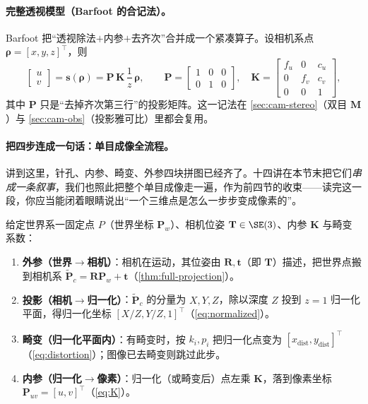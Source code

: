 \paragraph{完整透视模型（Barfoot 的合记法）。}
Barfoot\cite{barfoot2024state} 把“透视除法$+$内参$+$去齐次”合并成一个紧凑算子。设相机系点 $\boldsymbol\rho=[x,y,z]^\top$，则
\begin{equation}
  \begin{bmatrix}u\\v\end{bmatrix}=\mathbf{s}(\boldsymbol\rho)=\mathbf{P}\,\mathbf{K}\,\frac1z\,\boldsymbol\rho,\qquad
  \mathbf{P}=\begin{bmatrix}1&0&0\\0&1&0\end{bmatrix},\quad
  \mathbf{K}=\begin{bmatrix}f_u&0&c_u\\0&f_v&c_v\\0&0&1\end{bmatrix},
  \label{eq:complete-perspective}
\end{equation}
其中 $\mathbf{P}$ 只是“去掉齐次第三行”的投影矩阵。这一记法在 \cref{sec:cam-stereo}（双目 $\mathbf{M}$）与 \cref{sec:cam-obs}（投影雅可比）里都会复用。

\paragraph{把四步连成一句话：单目成像全流程。}
讲到这里，针孔、内参、畸变、外参四块拼图已经齐了。十四讲在本节末把它们\emph{串成一条叙事}\cite{gaoxiang2019slam14}，我们也照此把整个单目成像走一遍，作为前四节的收束——读完这一段，你应当能闭着眼睛说出“一个三维点是怎么一步步变成像素的”。

\begin{algo}[单目相机成像全流程]\label{alg:cam-pipeline}
给定世界系一固定点 $P$（世界坐标 $\mathbf{P}_w$）、相机位姿 $\mathbf{T}\in\SE(3)$、内参 $\mathbf{K}$ 与畸变系数：
\begin{enumerate}
  \item \textbf{外参（世界$\to$相机）}：相机在运动，其位姿由 $\mathbf{R},\mathbf{t}$（即 $\mathbf{T}$）描述，把世界点搬到相机系 $\tilde{\mathbf{P}}_c=\mathbf{R}\mathbf{P}_w+\mathbf{t}$（\cref{thm:full-projection}）。
  \item \textbf{投影（相机$\to$归一化）}：$\tilde{\mathbf{P}}_c$ 的分量为 $X,Y,Z$，除以深度 $Z$ 投到 $z=1$ 归一化平面，得归一化坐标 $[X/Z,Y/Z,1]^\top$（\cref{eq:normalized}）。
  \item \textbf{畸变（归一化平面内）}：有畸变时，按 $k_i,p_i$ 把归一化点变为 $[x_{\text{dist}},y_{\text{dist}}]^\top$（\cref{eq:distortion}）；图像已去畸变则跳过此步。
  \item \textbf{内参（归一化$\to$像素）}：归一化（或畸变后）点左乘 $\mathbf{K}$，落到像素坐标 $\mathbf{P}_{uv}=[u,v]^\top$（\cref{eq:K}）。
\end{enumerate}
\end{algo}


